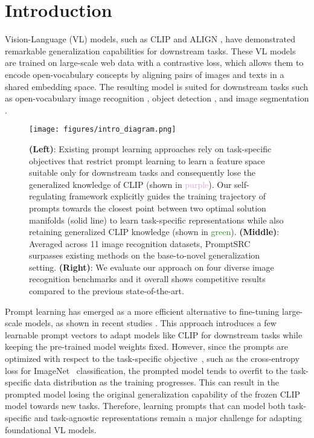 \documentclass[10pt,twocolumn,letterpaper]{article}
\newcommand{\txt}[1]{{\texttt{#1}}}
\newcommand\extrafootertext[1]{\bgroup
    \renewcommand\thefootnote{\fnsymbol{footnote}}\renewcommand\thempfootnote{\fnsymbol{mpfootnote}}\footnotetext[0]{#1}\egroup
}
\newcommand{\corrAuthor}{$^{\textrm{\Letter}}$}
\begin{document}
\extrafootertext{\textsuperscript{*}Joint first authors.\\
\indent\indent \textsuperscript{\corrAuthor}\txt{uzair.khattak@mbzuai.ac.ae}}

\section{Introduction}
Vision-Language (VL) models, such as CLIP \cite{radford2021learning} and ALIGN \cite{jia2021scaling}, have demonstrated remarkable generalization capabilities for downstream tasks. These VL models are trained on large-scale web data with a contrastive loss, which allows them to encode open-vocabulary concepts by aligning pairs of images and texts in a shared embedding space. The resulting model is suited for downstream tasks such as open-vocabulary image recognition \cite{kim2022how}, object detection \cite{ feng2022promptdet}, and image segmentation \cite{luddecke2022image}.

\begin{figure*}[!ht]
\centering\vspace{-1em}
{\texttt{[image: figures/intro\_diagram.png]}}\vspace{-0.5em}
\caption{{\color{blue}\textbf{(Left)}}: Existing prompt learning approaches rely on task-specific objectives that restrict prompt learning to learn a feature space suitable only for downstream tasks and consequently lose the generalized knowledge of CLIP (shown in \textcolor{Plum}{purple}). Our self-regulating framework explicitly guides the training trajectory of prompts towards the closest point between two optimal solution manifolds (solid line) to learn task-specific representations while also retaining generalized CLIP knowledge (shown in \textcolor{ForestGreen}{green}). {\color{blue}\textbf{(Middle)}}: Averaged across 11 image recognition datasets, PromptSRC surpasses existing methods on the base-to-novel generalization setting. {\color{blue}\textbf{(Right)}}: We evaluate our approach on four diverse image recognition benchmarks and it {overall shows competitive results} compared to the previous state-of-the-art.}  
\label{fig:concept_figure}
\end{figure*}



Prompt learning has emerged as a more efficient alternative to fine-tuning large-scale models, as shown in recent studies \cite{zhou2022conditional,zhou2022learning, chen2022prompt, huang2022unsupervised, shu2022test, lu2022prompt}. 
This approach introduces a few learnable prompt vectors to adapt models like CLIP for downstream tasks while keeping the pre-trained model weights fixed.
However, since the prompts are optimized with respect to the task-specific objective~\cite{zhou2022learning}, such as the cross-entropy loss for ImageNet~\cite{deng2009imagenet} classification, the prompted model tends to overfit to the task-specific data distribution as the training progresses. This can result in the prompted model losing the original generalization capability of the frozen CLIP model towards new tasks. Therefore, learning prompts that can model both task-specific and task-agnostic representations remain a major challenge for adapting foundational VL models.
\end{document}
